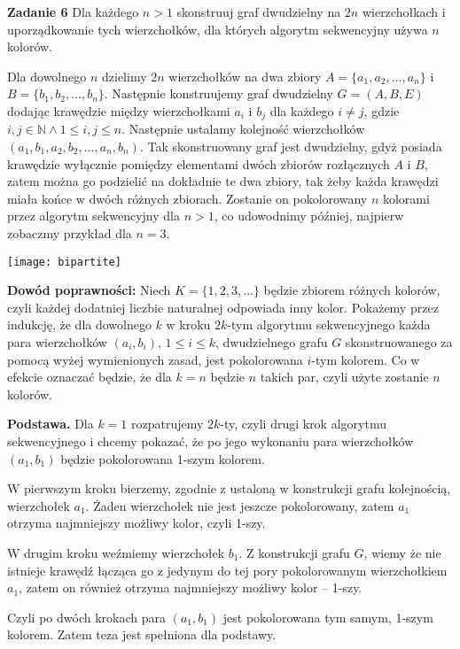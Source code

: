 \documentclass[12pt,a4paper]{article}
\begin{document}
\vskip 1cm
\noindent
\textbf{Zadanie 6} Dla każdego \( n > 1 \) skonstruuj graf dwudzielny na \(2n\) wierzchołkach i uporządkowanie tych wierzchołków, dla których algorytm sekwencyjny używa \(n\) kolorów.
\vskip 0.2cm

Dla dowolnego \(n\) dzielimy \(2n\) wierzchołków na dwa zbiory \(A = \{a_1,a_2,...,a_n\} \) i \(B = \{ b_1, b_2, ..., b_n \} \). Następnie konstruujemy graf dwudzielny \(G = (A,B,E)\) dodając krawędzie między wierzchołkami \(a_i\) i \(b_j\) dla każdego \(i \neq j\), gdzie \( i,j \in \mathbb{N} \wedge 1 \leq i,j \leq n \). Następnie ustalamy kolejność wierzchołków \( (a_1,b_1,a_2,b_2,...,a_n,b_n) \). Tak skonstruowany graf jest dwudzielny, gdyż posiada krawędzie wyłącznie pomiędzy elementami dwóch zbiorów rozłącznych \(A\) i \(B\), zatem można go podzielić na dokładnie te dwa zbiory, tak żeby każda krawędzi miała końce w dwóch różnych zbiorach. Zostanie on pokolorowany \(n\) kolorami przez algorytm sekwencyjny dla \( n > 1 \), co udowodnimy później, najpierw zobaczmy przykład dla \(n=3\).
\begin{center}
	\texttt{[image: bipartite]}
\end{center}

\textbf{Dowód poprawności:} Niech \(K = \{1,2,3,...\}\) będzie zbiorem różnych kolorów, czyli każdej dodatniej liczbie naturalnej odpowiada inny kolor. Pokażemy przez indukcję, że dla dowolnego \( k \) w kroku \(2k\)-tym algorytmu sekwencyjnego każda para wierzchołków \( (a_i, b_i) \), \( 1 \leq i \leq k\), dwudzielnego grafu \(G\) skonstruowanego za pomocą wyżej wymienionych zasad, jest pokolorowana \(i\)-tym kolorem. Co w efekcie oznaczać będzie, że dla \(k=n\) będzie \(n\) takich par, czyli użyte zostanie \(n\) kolorów.

\textbf{Podstawa.} Dla \(k=1\) rozpatrujemy \(2k\)-ty, czyli drugi krok algorytmu sekwencyjnego i chcemy pokazać, że po jego wykonaniu para wierzchołków \( (a_1, b_1) \) będzie pokolorowana 1-szym kolorem.

W pierwszym kroku bierzemy, zgodnie z ustaloną w konstrukcji grafu kolejnością, wierzchołek \(a_1\). Żaden wierzchołek nie jest jeszcze pokolorowany, zatem \(a_1\) otrzyma najmniejszy możliwy kolor, czyli 1-szy.

W drugim kroku weźmiemy wierzchołek \(b_1\). Z konstrukcji grafu \(G\), wiemy że nie istnieje krawędź łącząca go z jedynym do tej pory pokolorowanym wierzchołkiem \(a_1\), zatem on również otrzyma najmniejszy możliwy kolor -- 1-szy.

Czyli po dwóch krokach para \( (a_1,b_1) \) jest pokolorowana tym samym, 1-szym kolorem. Zatem teza jest spełniona dla podstawy.
\end{document}
